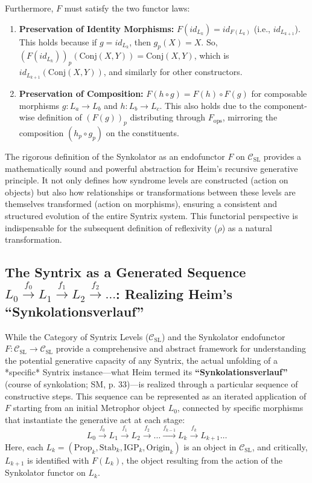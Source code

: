 \documentclass[
    12pt,              %
    a4paper,           %
    headings=normal,   %
    twoside=true,      %
    BCOR=8mm,          %
]{scrbook}
\newcommand{\q}[1]{\enquote{#1}}
\newcommand{\fops}{F_{\text{ops}}}
\begin{document}
\begin{itemize}
        Furthermore, \(F\) must satisfy the two functor laws:
        \begin{enumerate}[label=(\roman*)]
            \item  \textbf{Preservation of Identity Morphisms:} \(F(id_{L_k}) = id_{F(L_k)}\) (i.e., \(id_{L_{k+1}}\)).
                This holds because if \(g = id_{L_k}\), then \(g_p(X)=X\). So, \((F(id_{L_k}))_p(\text{Conj}(X,Y)) = \text{Conj}(X,Y)\), which is \(id_{L_{k+1}}(\text{Conj}(X,Y))\), and similarly for other constructors.
            \item  \textbf{Preservation of Composition:} \(F(h \circ g) = F(h) \circ F(g)\) for composable morphisms \(g: L_a \to L_b\) and \(h: L_b \to L_c\).
                This also holds due to the component-wise definition of \((F(g))_p\) distributing through \(\fops\), mirroring the composition \((h_p \circ g_p)\) on the constituents.
        \end{enumerate}
\end{itemize}
The rigorous definition of the Synkolator as an endofunctor \(F\) on \(\mathcal{C}_{\text{SL}}\) provides a mathematically sound and powerful abstraction for Heim's recursive generative principle. It not only defines how syndrome levels are constructed (action on objects) but also how relationships or transformations between these levels are themselves transformed (action on morphisms), ensuring a consistent and structured evolution of the entire Syntrix system. This functorial perspective is indispensable for the subsequent definition of reflexivity (\(\rho\)) as a natural transformation.

\subsection{The Syntrix as a Generated Sequence \(L_0 \xrightarrow{f_0} L_1 \xrightarrow{f_1} L_2 \xrightarrow{f_2} \ldots\): Realizing Heim's \q{Synkolationsverlauf}}
\label{sec:ch2_syntrix_as_sequence} 

While the Category of Syntrix Levels (\(\mathcal{C}_{\text{SL}}\)) and the Synkolator endofunctor \(F: \mathcal{C}_{\text{SL}} \to \mathcal{C}_{\text{SL}}\) provide a comprehensive and abstract framework for understanding the potential generative capacity of any Syntrix, the actual unfolding of a *specific* Syntrix instance—what Heim termed its \textbf{\q{Synkolationsverlauf}} (course of synkolation; SM, p. 33)—is realized through a particular sequence of constructive steps. This sequence can be represented as an iterated application of \(F\) starting from an initial Metrophor object \(L_0\), connected by specific morphisms that instantiate the generative act at each stage:
\[ L_0 \xrightarrow{f_0} L_1 \xrightarrow{f_1} L_2 \xrightarrow{f_2} \ldots \xrightarrow{f_{k-1}} L_k \xrightarrow{f_k} L_{k+1} \ldots \]
Here, each \(L_k = (\text{Prop}_k, \text{Stab}_k, \text{IGP}_k, \text{Origin}_k)\) is an object in \(\mathcal{C}_{\text{SL}}\), and critically, \(L_{k+1}\) is identified with \(F(L_k)\), the object resulting from the action of the Synkolator functor on \(L_k\).
\end{document}
